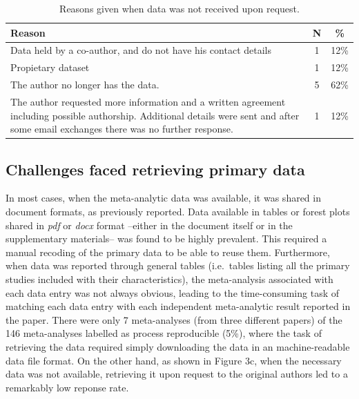 \documentclass[
  ,apa7,floatsintext]{apa6}
\begin{document}
\begin{table}

\caption{\label{tab:unnamed-chunk-2}Reasons given when data was not received upon request.}
\centering
\begin{tabular}[t]{>{\raggedright\arraybackslash}p{7cm}cc}
\toprule
Reason & N & \%\\
\midrule
Data held by a co-author, and do not have his contact details & 1 & 12\%\\
Propietary dataset & 1 & 12\%\\
The author no longer has the data. & 5 & 62\%\\
The author requested more information and a written agreement including possible authorship. 
                                                      Additional details were sent and after some email exchanges there was no further response. & 1 & 12\%\\
\bottomrule
\end{tabular}
\end{table}

\hypertarget{challenges-faced-retrieving-primary-data}{%
\subsection{Challenges faced retrieving primary data}\label{challenges-faced-retrieving-primary-data}}

In most cases, when the meta-analytic data was available, it was shared in document formats, as previously reported. Data available in tables or forest plots shared in \emph{pdf} or \emph{docx} format --either in the document itself or in the supplementary materials-- was found to be highly prevalent. This required a manual recoding of the primary data to be able to reuse them. Furthermore, when data was reported through general tables (i.e.~tables listing all the primary studies included with their characteristics), the meta-analysis associated with each data entry was not always obvious, leading to the time-consuming task of matching each data entry with each independent meta-analytic result reported in the paper. There were only 7 meta-analyses (from three different papers) of the 146 meta-analyses labelled as process reproducible (5\%), where the task of retrieving the data required simply downloading the data in an machine-readable data file format.
On the other hand, as shown in Figure 3c, when the necessary data was not available, retrieving it upon request to the original authors led to a remarkably low reponse rate.
\end{document}
